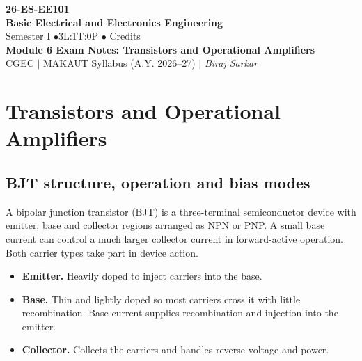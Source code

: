 \documentclass[12pt,a4paper]{article}
\begin{document}
\begin{center}
  {\Large\bfseries\color{myred} 26-ES-EE101}\\[3pt]
  {\LARGE\bfseries\color{myred} Basic Electrical and Electronics Engineering}\\[5pt]
  {\normalsize\color{mydark} Semester I \quad$\bullet$\quad 3L:1T:0P \quad$\bullet$ Credits}\\[3pt]
  {\normalsize\color{myteal}\textbf{Module 6 Exam Notes: Transistors and Operational Amplifiers}}\\[3pt]
  {\small\color{mydark} CGEC \;$|$\; MAKAUT Syllabus (A.Y. 2026--27) \;$|$\; \textit{Biraj Sarkar}}
\end{center}
\vspace{2pt}
\noindent{\color{myred}\rule{\linewidth}{1.5pt}}
\vspace{2pt}

\hypersetup{linkcolor=mydark}
\tableofcontents
\hypersetup{linkcolor=myteal}
\newpage

\section{Transistors and Operational Amplifiers}

\subsection{BJT structure, operation and bias modes}
\begin{tcolorbox}[defbox,title={Bipolar junction transistor}]
A bipolar junction transistor (BJT) is a three-terminal semiconductor device with emitter, base and collector regions arranged as NPN or PNP. A small base current can control a much larger collector current in forward-active operation. Both carrier types take part in device action.
\end{tcolorbox}

\begin{itemize}[leftmargin=*, itemsep=3pt, topsep=4pt]
  \item \textbf{Emitter.} Heavily doped to inject carriers into the base.
  \item \textbf{Base.} Thin and lightly doped so most carriers cross it with little recombination. Base current supplies recombination and injection into the emitter.
  \item \textbf{Collector.} Collects the carriers and handles reverse voltage and power.
\end{itemize}
\end{document}
